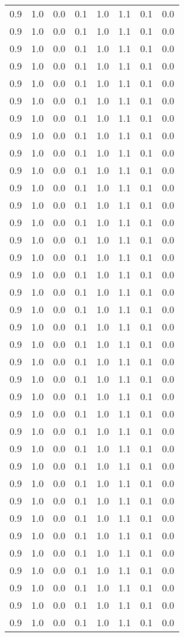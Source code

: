 \begin{tabular}{L{1in}|L{1in}|L{1in}|L{1in}|L{1in}|L{1in}|L{1in}|L{1in}}
0.9&1.0&0.0&0.1&1.0&1.1&0.1&0.0\\
0.9&1.0&0.0&0.1&1.0&1.1&0.1&0.0\\
0.9&1.0&0.0&0.1&1.0&1.1&0.1&0.0\\
0.9&1.0&0.0&0.1&1.0&1.1&0.1&0.0\\
0.9&1.0&0.0&0.1&1.0&1.1&0.1&0.0\\
0.9&1.0&0.0&0.1&1.0&1.1&0.1&0.0\\
0.9&1.0&0.0&0.1&1.0&1.1&0.1&0.0\\
0.9&1.0&0.0&0.1&1.0&1.1&0.1&0.0\\
0.9&1.0&0.0&0.1&1.0&1.1&0.1&0.0\\
0.9&1.0&0.0&0.1&1.0&1.1&0.1&0.0\\
0.9&1.0&0.0&0.1&1.0&1.1&0.1&0.0\\
0.9&1.0&0.0&0.1&1.0&1.1&0.1&0.0\\
0.9&1.0&0.0&0.1&1.0&1.1&0.1&0.0\\
0.9&1.0&0.0&0.1&1.0&1.1&0.1&0.0\\
0.9&1.0&0.0&0.1&1.0&1.1&0.1&0.0\\
0.9&1.0&0.0&0.1&1.0&1.1&0.1&0.0\\
0.9&1.0&0.0&0.1&1.0&1.1&0.1&0.0\\
0.9&1.0&0.0&0.1&1.0&1.1&0.1&0.0\\
0.9&1.0&0.0&0.1&1.0&1.1&0.1&0.0\\
0.9&1.0&0.0&0.1&1.0&1.1&0.1&0.0\\
0.9&1.0&0.0&0.1&1.0&1.1&0.1&0.0\\
0.9&1.0&0.0&0.1&1.0&1.1&0.1&0.0\\
0.9&1.0&0.0&0.1&1.0&1.1&0.1&0.0\\
0.9&1.0&0.0&0.1&1.0&1.1&0.1&0.0\\
0.9&1.0&0.0&0.1&1.0&1.1&0.1&0.0\\
0.9&1.0&0.0&0.1&1.0&1.1&0.1&0.0\\
0.9&1.0&0.0&0.1&1.0&1.1&0.1&0.0\\
0.9&1.0&0.0&0.1&1.0&1.1&0.1&0.0\\
0.9&1.0&0.0&0.1&1.0&1.1&0.1&0.0\\
0.9&1.0&0.0&0.1&1.0&1.1&0.1&0.0\\
0.9&1.0&0.0&0.1&1.0&1.1&0.1&0.0\\
0.9&1.0&0.0&0.1&1.0&1.1&0.1&0.0\\
0.9&1.0&0.0&0.1&1.0&1.1&0.1&0.0\\
0.9&1.0&0.0&0.1&1.0&1.1&0.1&0.0\\
0.9&1.0&0.0&0.1&1.0&1.1&0.1&0.0\\
0.9&1.0&0.0&0.1&1.0&1.1&0.1&0.0\\

\end{tabular}
